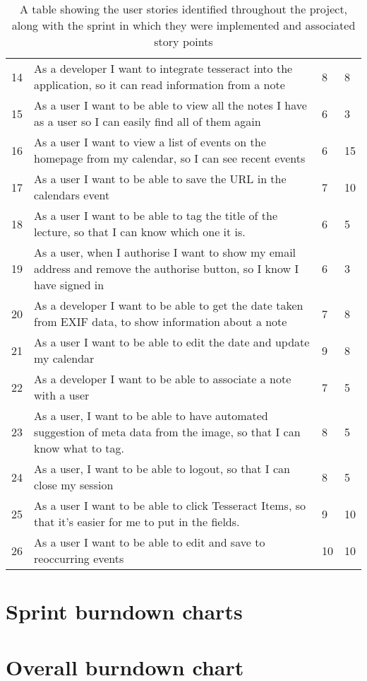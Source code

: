 \begin{table}[h!]
\begin{tabular}{||p{1cm} p{10cm} p{1cm} p{1cm}||}
 14&As a developer I want to integrate tesseract into the application, so it can read information from a note&8&8 \\
 15&As a user I want to be able to view all the notes I have as a user so I can easily find all of them again&6&3 \\
 16&As a user I want to view a list of events on the homepage from my calendar, so I can see recent events&6&15 \\
 17&As a user I want to be able to save the URL in the calendars event&7&10 \\
 18&As a user I want to be able to tag the title of the lecture, so that I can know which one it is.&6&5 \\
 19&As a user, when I authorise I want to show my email address and remove the authorise button, so I know I have signed in&6&3 \\
 20&As a developer I want to be able to get the date taken from EXIF data, to show information about a note&7&8 \\
 21&As a user I want to be able to edit the date and update my calendar&9&8 \\
 22&As a developer I want to be able to associate a note with a user&7&5 \\
 23&As a user, I want to be able to have automated suggestion of meta data from the image, so that I can know what to tag.&8&5 \\
 24&As a user, I want to be able to logout, so that I can close my session&8&5 \\
 25&As a user I want to be able to click Tesseract Items, so that it's easier for me to put in the fields.&9&10 \\
 26&As a user I want to be able to edit and save to reoccurring events&10&10 \\
 \hline
 \end{tabular}
 \caption{A table showing the user stories identified throughout the project, along with the sprint in which they were implemented and associated story points}
\end{table}

\section{Sprint burndown charts}

\section{Overall burndown chart}
